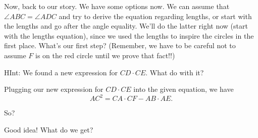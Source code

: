 Now, back to our story. We have some options now. We can assume that $\angle ABC = \angle ADC$ and try to derive the equation regarding lengths, or start with the lengths and go after the angle equality. We'll do the latter right now (start with the lengths equation), since we used the lengths to inspire the circles in the first place. What's our first step? (Remember, we have to be careful not to assume $F$ is on the red circle until we prove that fact!!)

HInt: We found a new expression for $CD \cdot CE$. What do with it?








Plugging our new expression for $CD \cdot CE$ into the given equation, we have
$$ AC^2 = CA \cdot CF - AB \cdot AE . $$

So?


Good idea! What do we get?






